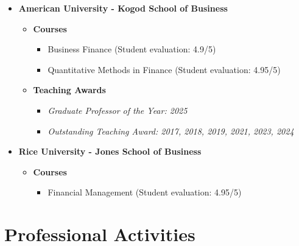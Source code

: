 \documentclass{article}[12]
\begin{document}
\begin{itemize}[itemsep=0.005em]
    \item \textbf{American University - Kogod School of Business}
    \begin{itemize}
        \item[$\bullet$] \textbf{Courses}
        \begin{itemize}
            \item[-] Business Finance (Student evaluation: 4.9/5)
            \item[-] Quantitative Methods in Finance (Student evaluation: 4.95/5)
        \end{itemize}
        \item[$\bullet$] \textbf{Teaching Awards}
        \begin{itemize}[leftmargin=0.5cm]
            \item[-] \textit{Graduate Professor of the Year: 2025}
            \item[-] \textit{Outstanding Teaching Award: 2017, 2018, 2019, 2021, 2023, 2024}
        \end{itemize}
    \end{itemize}

    \item \textbf{Rice University - Jones School of Business}
    \begin{itemize}
        \item[$\bullet$] \textbf{Courses}
        \begin{itemize}
            \item[-] Financial Management (Student evaluation: 4.95/5)
        \end{itemize}
    \end{itemize}
\end{itemize}

\section{Professional Activities}
\end{document}
